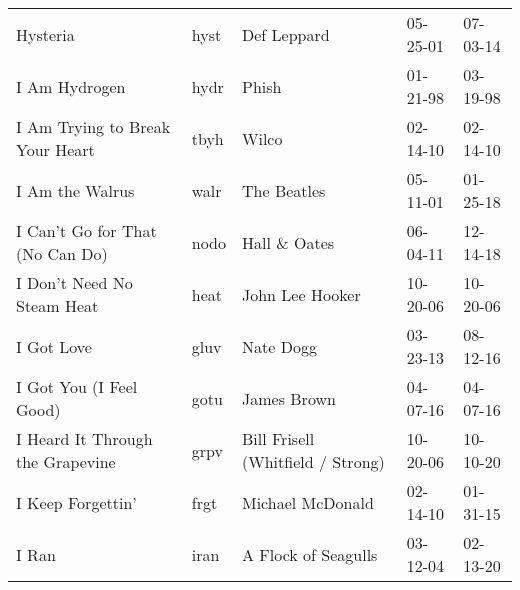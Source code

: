\begin{longtable}{p{}p{}p{}p{}p{}}
                                                                Hysteria &          hyst &                                              Def Leppard &              05-25-01 &             07-03-14 \\
                                                           I Am Hydrogen &          hydr &                                                    Phish &              01-21-98 &             03-19-98 \\
                                         I Am Trying to Break Your Heart &          tbyh &                                                    Wilco &              02-14-10 &             02-14-10 \\
                                                         I Am the Walrus &          walr &                                              The Beatles &              05-11-01 &             01-25-18 \\
                                         I Can't Go for That (No Can Do) &          nodo &                                            Hall \& Oates &              06-04-11 &             12-14-18 \\
                                              I Don't Need No Steam Heat &          heat &                                          John Lee Hooker &              10-20-06 &             10-20-06 \\
                                                              I Got Love &          gluv &                                                Nate Dogg &              03-23-13 &             08-12-16 \\
                                                 I Got You (I Feel Good) &          gotu &                                              James Brown &              04-07-16 &             04-07-16 \\
                                        I Heard It Through the Grapevine &          grpv &                        Bill Frisell (Whitfield / Strong) &              10-20-06 &             10-10-20 \\
                                                       I Keep Forgettin' &          frgt &                                         Michael McDonald &              02-14-10 &             01-31-15 \\
                                                                   I Ran &          iran &                                      A Flock of Seagulls &              03-12-04 &             02-13-20 \\

\end{longtable}
